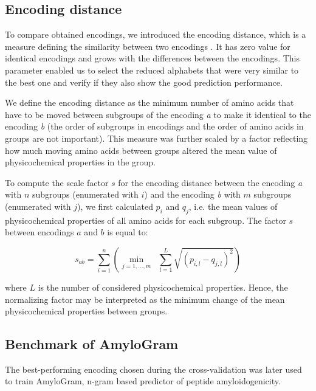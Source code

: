 \documentclass[a4,center,fleqn]{NAR}
\begin{document}
\subsection{Encoding distance}
To compare obtained encodings, we introduced the encoding distance, which is a measure defining the similarity between two encodings . It has zero value for identical encodings and grows with the differences between the encodings. This parameter enabled us to select the reduced alphabets that were very similar to the best one and verify if they also show the good prediction performance.

  We define the encoding distance as the minimum number of amino acids that 
have to be moved between subgroups of the encoding \textit{a} to make it identical 
to the encoding \textit{b} (the order of subgroups in encodings and the order of amino acids in groups 
are not important). This measure was further scaled by a factor reflecting how 
much moving amino acids between groups altered the mean value of physicochemical properties in the group. 

To compute the scale factor $s$ for the encoding distance between 
the encoding \textit{a} with $n$ subgroups (enumerated with $i$) and the encoding \textit{b} with $m$ 
subgroups (enumerated with $j$), we first calculated $p_i$ and $q_j$, i.e. the mean values of physicochemical 
properties of all amino acids for each subgroup. 
%
%
The factor $s$ between encodings $a$ and $b$ is equal to: 

$$
s_{ab} = \sum^n_{i = 1}  \left( \min_{j=1,\dots,m} \; \; \sum^L_{l=1} \sqrt{ (p_{i,l} - q_{j,l})^2} \right)
$$

where $L$ is the number of considered physicochemical properties. Hence, 
the normalizing factor may be interpreted as the minimum change of the mean physicochemical properties between groups.

\subsection{Benchmark of AmyloGram}

The best-performing encoding chosen during the cross-validation was later used 
to train AmyloGram, n-gram based predictor of peptide amyloidogenicity.
\end{document}
